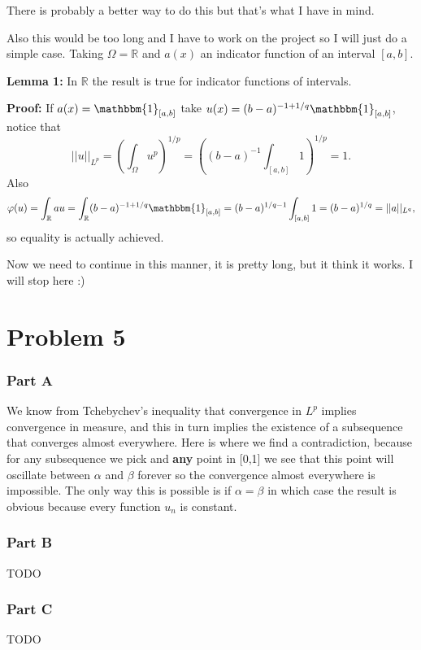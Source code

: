 \documentclass{article}
\begin{document}
There is probably a better way to do this but that's what I have in mind.

Also this would be too long and I have to work on the project so I will just do
a simple case. Taking $\Omega = \mathbb{R}$ and $a(x)$ an indicator function of
an interval $[a,b]$.

\textbf{Lemma 1:} In $\mathbb{R}$ the result is true for indicator functions of
intervals.

\textbf{Proof:} If $a(x)=\mathbbm{1}_{[a,b]}$ take
$u(x)=(b-a)^{-1+1/q}\mathbbm{1}_{[a,b]}$, notice that
\[
	||u||_{L^p}=\left(\int_\Omega u^{p}\right)^{1/p}=\left(
	(b-a)^{-1}\int_{[a,b]} 1 \right)^{1/p} =1.
\]
Also
\[
	\varphi(u)= \int_\mathbb{R} au = \int_\mathbb{R} (b-a)^{-1+1/q}
	\mathbbm{1}_{[a,b]} =(b-a)^{1/q-1}\int_{[a,b]}1=(b-a)^{1/q}=||a||_{L^q},
\]
so equality is actually achieved.

Now we need to continue in this manner, it is pretty long, but it think it
works. I will stop here :)
\section*{Problem 5}
\subsubsection*{Part A}
We know from Tchebychev's inequality that convergence in $L^p$ implies
convergence in measure, and this in turn implies the existence of a subsequence
that converges almost everywhere. Here is where we find a contradiction,
because for any subsequence we pick and \textbf{any} point in [0,1] we see that
this point will oscillate between $\alpha$ and $\beta$ forever so the
convergence almost everywhere is impossible. The only way this is possible is
if $\alpha = \beta$ in which case the result is obvious because every function
$u_n$ is constant.
\subsubsection*{Part B}
TODO
\subsubsection*{Part C}
TODO
\end{document}
